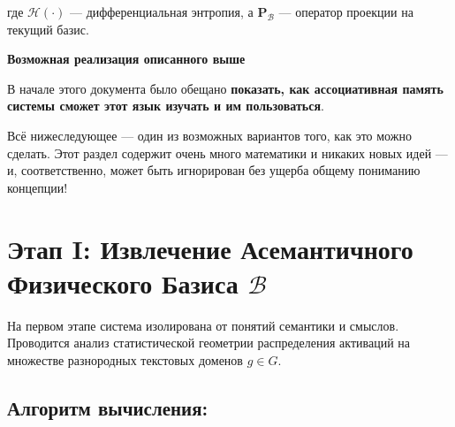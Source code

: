 \documentclass[11pt,a4paper]{article}
\begin{document}
где $\mathcal{H}(\cdot)$ — дифференциальная энтропия, а $\mathbf{P}_{\mathcal{B}}$ — оператор проекции на текущий базис.

\clearpage
{}
{}
\begin{center}
{\Huge\bfseries Возможная реализация описанного выше\par}
\end{center}
\vspace{0.8cm}

В начале этого документа было обещано \textbf{показать, как ассоциативная память системы сможет этот язык изучать и им пользоваться}.

Всё нижеследующее — один из возможных вариантов того, как это можно сделать. Этот раздел содержит очень много математики и никаких новых идей — и, соответственно, может быть игнорирован без ущерба общему пониманию концепции!

\footnotesize
\section{Этап I: Извлечение Асемантичного Физического Базиса $\mathcal{B}$}

На первом этапе система изолирована от понятий семантики и смыслов. Проводится анализ статистической геометрии распределения активаций на множестве разнородных текстовых доменов $g \in G$.

\begin{center}
\end{center}

\subsection*{Алгоритм вычисления:}
\end{document}
